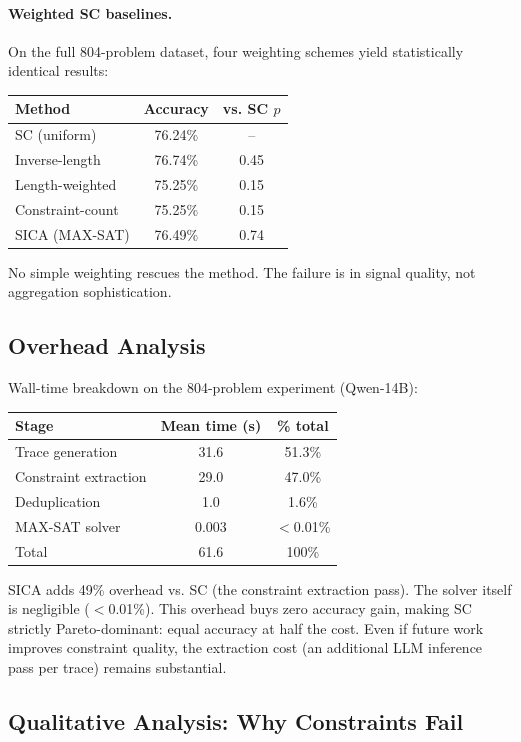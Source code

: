 \documentclass[11pt,a4paper]{article}
\begin{document}
\paragraph{Weighted SC baselines.} On the full 804-problem dataset, four weighting schemes yield statistically identical results:
\begin{center}
\small
\begin{tabular}{lcc}
\toprule
Method & Accuracy & vs. SC $p$ \\
\midrule
SC (uniform) & 76.24\% & -- \\
Inverse-length & 76.74\% & 0.45 \\
Length-weighted & 75.25\% & 0.15 \\
Constraint-count & 75.25\% & 0.15 \\
SICA (MAX-SAT) & 76.49\% & 0.74 \\
\bottomrule
\end{tabular}
\end{center}
No simple weighting rescues the method. The failure is in signal quality, not aggregation sophistication.

\subsection{Overhead Analysis}

Wall-time breakdown on the 804-problem experiment (Qwen-14B):
\begin{center}
\small
\begin{tabular}{lcc}
\toprule
Stage & Mean time (s) & \% total \\
\midrule
Trace generation & 31.6 & 51.3\% \\
Constraint extraction & 29.0 & 47.0\% \\
Deduplication & 1.0 & 1.6\% \\
MAX-SAT solver & 0.003 & $<$0.01\% \\
\midrule
Total & 61.6 & 100\% \\
\bottomrule
\end{tabular}
\end{center}

SICA adds 49\% overhead vs. SC (the constraint extraction pass). The solver itself is negligible ($<$0.01\%). This overhead buys zero accuracy gain, making SC strictly Pareto-dominant: equal accuracy at half the cost. Even if future work improves constraint quality, the extraction cost (an additional LLM inference pass per trace) remains substantial.

\subsection{Qualitative Analysis: Why Constraints Fail}
\label{sec:case-studies}
\end{document}
